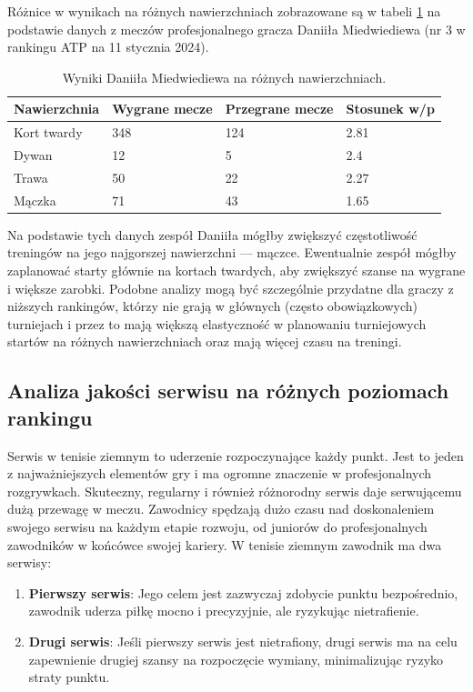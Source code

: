 \documentclass[12pt, a4paper]{article}
\begin{document}
Różnice w wynikach na różnych nawierzchniach zobrazowane są w tabeli \ref{tab:surfaces} na podstawie danych z meczów profesjonalnego gracza Daniiła Miedwiediewa (nr 3 w rankingu ATP na 11 stycznia 2024).
\begin{table}[h]
    \footnotesize
    \centering
    \begin{tabular}{l l l l} 
        \hline
        \textbf{Nawierzchnia} & \textbf{Wygrane mecze} & \textbf{Przegrane mecze} & \textbf{Stosunek w/p} \\
        \hline
        Kort twardy & 348 & 124 & 2.81 \\ 
        Dywan & 12 & 5 & 2.4 \\
        Trawa & 50 & 22 & 2.27 \\
        Mączka & 71 & 43 & 1.65 \\ 
        \hline
    \end{tabular}
    \caption{Wyniki Daniiła Miedwiediewa na różnych nawierzchniach.}
    \label{tab:surfaces}
\end{table}
Na podstawie tych danych zespół Daniiła mógłby zwiększyć częstotliwość treningów na jego najgorszej nawierzchni --- mączce. Ewentualnie zespół mógłby zaplanować starty głównie na kortach twardych, aby zwiększyć szanse na wygrane i większe zarobki. Podobne analizy mogą być szczególnie przydatne dla graczy z niższych rankingów, którzy nie grają w głównych (często obowiązkowych) turniejach i przez to mają większą elastyczność w planowaniu turniejowych startów na różnych nawierzchniach oraz mają więcej czasu na treningi.


\subsection{Analiza jakości serwisu na różnych poziomach rankingu}
Serwis w tenisie ziemnym to uderzenie rozpoczynające każdy punkt. Jest to jeden z najważniejszych elementów gry i ma ogromne znaczenie w profesjonalnych rozgrywkach. Skuteczny, regularny i również różnorodny serwis daje serwującemu dużą przewagę w meczu. Zawodnicy spędzają dużo czasu nad doskonaleniem swojego serwisu na każdym etapie rozwoju, od juniorów do profesjonalnych zawodników w końcówce swojej kariery. W tenisie ziemnym zawodnik ma dwa serwisy:
\begin{enumerate}
    \item \textbf{Pierwszy serwis}: Jego celem jest zazwyczaj zdobycie punktu bezpośrednio, zawodnik uderza piłkę mocno i precyzyjnie, ale ryzykując nietrafienie.
    \item \textbf{Drugi serwis}: Jeśli pierwszy serwis jest nietrafiony, drugi serwis ma na celu zapewnienie drugiej szansy na rozpoczęcie wymiany, minimalizując ryzyko straty punktu.
\end{enumerate}
\end{document}
